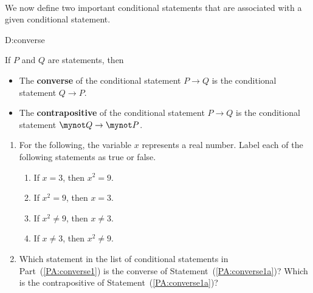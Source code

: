 \begin{previewactivity}\label{PA:converse} \hfill \\
We now define two important conditional statements that are associated with a given conditional statement.
\begin{defbox}{D:converse}{If  $P$  and  $Q$  are statements, then
  \begin{itemize}
    \item The \textbf{converse}
%
%
 of the conditional statement  $P \to Q$ is the conditional statement $Q \to P$.
    \item The \textbf{contrapositive} 
\label{D:contrapositive}%
%
%
 of the conditional statement  $P \to Q$ is the conditional statement  $\mynot  Q \to \mynot  P$. 
  \end{itemize}}
\end{defbox}
%
\begin{enumerate}
\item \label{PA:converse1}%
For the  following, the variable $x$  represents a real number.  Label each of the following statements as true or false. 

\begin{multicols}{2}
  \begin{enumerate}
    \item \label{PA:converse1a}%
          If  $x = 3$, then  $x^2  = 9$. 
    \item If  $x^2  = 9$, then  $x = 3$.
    \item If  $x^2  \ne 9$,  then  $x \ne 3$.
    \item If  $x \ne 3$, then  $x^2  \ne 9$.
  \end{enumerate}
\end{multicols}

\item Which statement in the list of conditional statements in Part~(\ref{PA:converse1}) is the converse of Statement~(\ref{PA:converse1a})?  Which is the contrapositive of Statement~(\ref{PA:converse1a})?


\end{enumerate}
\end{previewactivity}
